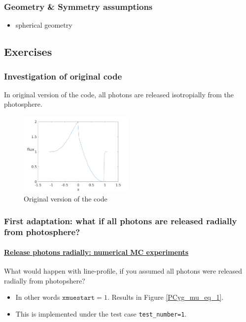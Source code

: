 \documentclass[../main/main.tex]{subfiles}
\begin{document}
\subsubsection{Geometry \& Symmetry assumptions}
\begin{itemize}
\item spherical geometry
\end{itemize}


\newpage
\subsection{Exercises}
\subsubsection{Investigation of original code}
In original version of the code, all photons are released isotropially from the photosphere.

\begin{figure}[!htp]
\centering
\includegraphics[width=0.5\textwidth]{../../introductory_exercises/P_Cygni_profile_UV_resonance/npot6xk0100alpha0beta1test0.png}
\caption{Original version of the code}
\end{figure}

\newpage
\subsubsection{First adaptation: what if all photons are released radially from photosphere?}
\label{PCYG FIRST adaptation}

\paragraph{\underline{Release photons radially: numerical MC experiments}}
What would happen with line-profile, if you assumed all photons
were released radially from photopshere?
\begin{itemize}
\item In other words $\texttt{xmuestart} = 1$. Results in Figure \ref{PCyg_mu_eq_1}.
\item This is implemented under the test case \texttt{test\_number=1}.
\end{itemize}
\end{document}
